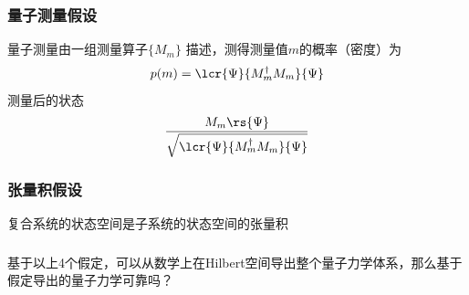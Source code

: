 \begin{frame}
    \frametitle{量子测量假设}
    \begin{tcolorbox4}[3. 量子测量假设]
    量子测量由一组测量算子$\{ M_m\}$ 描述，测得测量值$m$的概率（密度）为
    \[ p(m)=\lcr{\Psi}{M_m ^\dagger M_m}{\Psi} 
     \]
     测量后的状态 \[\frac{M_m\rs{\Psi}}{\sqrt{\lcr{\Psi}{M_m ^\dagger M_m}{\Psi}}}\]
    \end{tcolorbox4}
\end{frame}

\begin{frame}
    \frametitle{张量积假设}
    \begin{tcolorbox4}[4. 复合系统假设]
    复合系统的状态空间是子系统的状态空间的张量积
    \end{tcolorbox4}
\end{frame}

\begin{frame}
    \frametitle{}
    \begin{tcolorbox3}[学术讨论]
    基于以上4个假定，可以从数学上在Hilbert空间导出整个量子力学体系，那么基于假定导出的量子力学可靠吗？
    \end{tcolorbox3}
\end{frame}